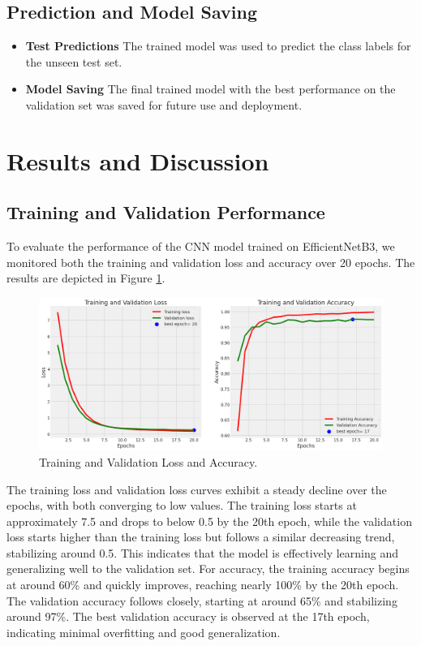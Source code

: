 \documentclass[conference]{IEEEtran}
\begin{document}
\subsection{Prediction and Model Saving}
\begin{itemize}
    \item \textbf{Test Predictions} The trained model was used to predict the class labels for the unseen test set.
    \item \textbf{Model Saving} The final trained model with the best performance on the validation set was saved for future use and deployment.
\end{itemize}


\section{Results and Discussion}
\subsection{Training and Validation Performance}
To evaluate the performance of the CNN model trained on EfficientNetB3, we monitored both the training and validation loss and accuracy over 20 epochs. The results are depicted in Figure \ref{fig4}.

\begin{figure}[H]
    \centerline{\includegraphics[width=\linewidth]{fig4.png}}
    \caption{Training and Validation Loss and Accuracy.}
    \label{fig4}
\end{figure}

The training loss and validation loss curves exhibit a steady decline over the epochs, with both converging to low values. The training loss starts at approximately 7.5 and drops to below 0.5 by the 20th epoch, while the validation loss starts higher than the training loss but follows a similar decreasing trend, stabilizing around 0.5. This indicates that the model is effectively learning and generalizing well to the validation set.
For accuracy, the training accuracy begins at around 60\% and quickly improves, reaching nearly 100\% by the 20th epoch. The validation accuracy follows closely, starting at around 65\% and stabilizing around 97\%. The best validation accuracy is observed at the 17th epoch, indicating minimal overfitting and good generalization.
\end{document}
